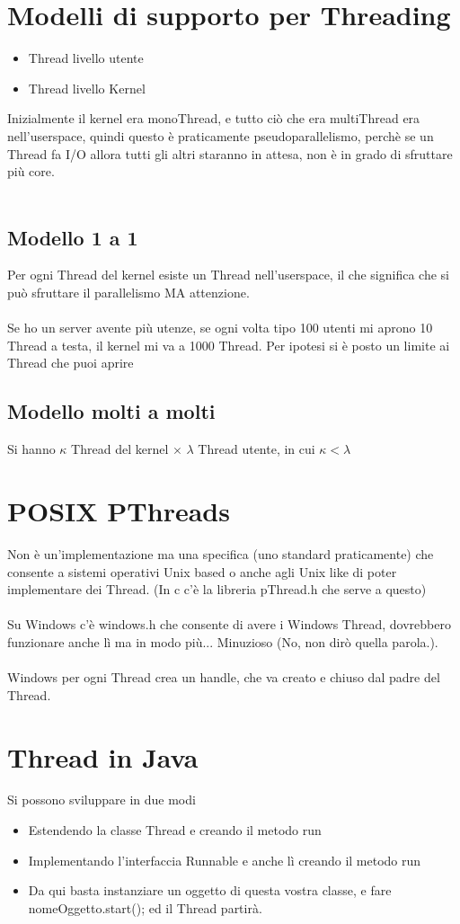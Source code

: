 \documentclass[12pt, a4paper, openany, twoside]{book}
\begin{document}
\section{Modelli di supporto per Threading}
\begin{itemize}
	\item Thread livello utente
	\item Thread livello Kernel\\
\end{itemize}
Inizialmente il kernel era monoThread, e tutto ciò che era multiThread era 
nell'userspace, quindi questo è praticamente pseudoparallelismo, perchè se un
Thread fa I/O allora tutti gli altri staranno in attesa, non è in grado di 
sfruttare più core.\\ \\
\subsection{Modello 1 a 1 } Per ogni Thread del kernel esiste un Thread 
nell'userspace, il che significa che si può sfruttare il parallelismo MA
attenzione.
\\ \\
Se ho un server avente più utenze, se ogni volta tipo 100 utenti mi aprono 
10 Thread a testa, il kernel mi va a 1000 Thread. Per ipotesi si è posto
un limite ai Thread che puoi aprire
\subsection{Modello molti a molti}
Si hanno $\kappa$ Thread del kernel $\times$ $\lambda$ Thread utente, in cui
$\kappa < \lambda$
\section{POSIX PThreads}
Non è un'implementazione ma una specifica (uno standard praticamente) che
consente a sistemi operativi Unix based o anche agli Unix like di poter 
implementare dei Thread. (In c c'è la libreria pThread.h che serve a questo)\\ \\
Su Windows c'è windows.h che consente di avere i Windows Thread, dovrebbero
funzionare anche lì ma in modo più... Minuzioso (No, non dirò quella parola.).
\\ \\
Windows per ogni Thread crea un handle, che va creato e chiuso dal padre del 
Thread.
\section{Thread in Java}
Si possono sviluppare in due modi
\begin{itemize}
	\item Estendendo la classe Thread e creando il metodo run
	\item Implementando l'interfaccia Runnable e anche lì creando il metodo run
	\item Da qui basta instanziare un oggetto di questa vostra classe, e fare
	nomeOggetto.start(); ed il Thread partirà.
\end{itemize}
\end{document}
